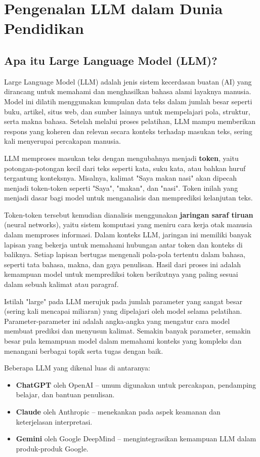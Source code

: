 \chapter{Pengenalan LLM dalam Dunia Pendidikan}

\section{Apa itu Large Language Model (LLM)?}

Large Language Model (LLM) adalah jenis sistem kecerdasan buatan (AI) yang dirancang untuk memahami dan menghasilkan bahasa alami layaknya manusia. Model ini dilatih menggunakan kumpulan data teks dalam jumlah besar seperti buku, artikel, situs web, dan sumber lainnya untuk mempelajari pola, struktur, serta makna bahasa. Setelah melalui proses pelatihan, LLM mampu memberikan respons yang koheren dan relevan secara konteks terhadap masukan teks, sering kali menyerupai percakapan manusia.

LLM memproses masukan teks dengan mengubahnya menjadi \textbf{token}, yaitu potongan-potongan kecil dari teks seperti kata, suku kata, atau bahkan huruf tergantung konteksnya. Misalnya, kalimat "Saya makan nasi" akan dipecah menjadi token-token seperti "Saya", "makan", dan "nasi". Token inilah yang menjadi dasar bagi model untuk menganalisis dan memprediksi kelanjutan teks.

Token-token tersebut kemudian dianalisis menggunakan \textbf{jaringan saraf tiruan} (neural networks), yaitu sistem komputasi yang meniru cara kerja otak manusia dalam memproses informasi. Dalam konteks LLM, jaringan ini memiliki banyak lapisan yang bekerja untuk memahami hubungan antar token dan konteks di baliknya. Setiap lapisan bertugas mengenali pola-pola tertentu dalam bahasa, seperti tata bahasa, makna, dan gaya penulisan. Hasil dari proses ini adalah kemampuan model untuk memprediksi token berikutnya yang paling sesuai dalam sebuah kalimat atau paragraf.

Istilah "large" pada LLM merujuk pada jumlah parameter yang sangat besar (sering kali mencapai miliaran) yang dipelajari oleh model selama pelatihan. Parameter-parameter ini adalah angka-angka yang mengatur cara model membuat prediksi dan menyusun kalimat. Semakin banyak parameter, semakin besar pula kemampuan model dalam memahami konteks yang kompleks dan menangani berbagai topik serta tugas dengan baik.

Beberapa LLM yang dikenal luas di antaranya:
\begin{itemize}
	\item \textbf{ChatGPT} oleh OpenAI – umum digunakan untuk percakapan, pendamping belajar, dan bantuan penulisan.
	\item \textbf{Claude} oleh Anthropic – menekankan pada aspek keamanan dan keterjelasan interpretasi.
	\item \textbf{Gemini} oleh Google DeepMind – mengintegrasikan kemampuan LLM dalam produk-produk Google.
\end{itemize}


